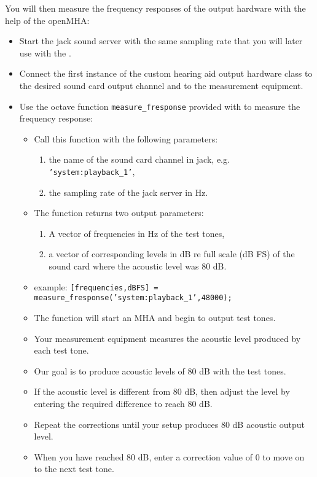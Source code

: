 \documentclass[11pt,a4paper,twoside]{article}
\newcommand{\+}{\discretionary{\mbox{\scriptsize$\hookleftarrow$}}{}{}}
\begin{document}
You will then measure the frequency responses of the output hardware
with the help of the openMHA:

\begin{itemize}
\item
  Start the jack sound server with the same sampling rate that you
  will later use with the \mha{}.
\item
  Connect the first instance of the custom hearing aid output hardware
  class to the desired sound card output channel and to the
  measurement equipment.
\item
  Use the octave function \texttt{measure\_fresponse} provided with
  \mha{} to measure the frequency response:
  \begin{itemize}
  \item Call this function with the following parameters:
    \begin{enumerate}
    \item the name of the sound card channel in jack,
      e.g. \texttt{'system:playback\_1'},
    \item the sampling rate of the jack server in Hz.
    \end{enumerate}
  \item The function returns two output parameters:
    \begin{enumerate}
    \item A vector of frequencies in Hz of the test tones,
    \item a vector of corresponding levels in dB re full scale (dB FS) of the sound card where the acoustic level was 80 dB.
    \end{enumerate}
  \item
    example: \texttt{[frequencies,dBFS] = measure\_fresponse('system:playback\_1',48000);}
  \item
    The function will start an MHA and begin to output test tones.
  \item
    Your measurement equipment measures the acoustic level produced by each test tone.
  \item
    Our goal is to produce acoustic levels of 80 dB with the test tones.
  \item
    If the acoustic level is different from 80 dB, then adjust the level
    by entering the required difference to reach 80 dB.
  \item
    Repeat the corrections until your setup produces 80 dB acoustic output level.
  \item
    When you have reached 80 dB, enter a correction value of 0 to move on to the next test tone.

\end{itemize}
\end{itemize}
\end{document}
